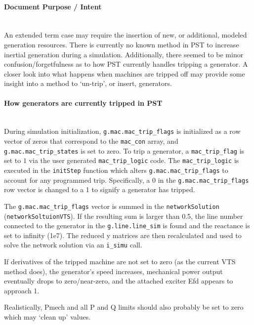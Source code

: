\documentclass[12pt]{article}
\begin{document}
\onehalfspacing
\paragraph{Document Purpose / Intent} \ \\
An extended term case may require the insertion of new, or additional, modeled generation resources.
There is currently no known method in PST to increase inertial generation during a simulation.
Additionally, there seemed to be minor confusion/forgetfulness as to how PST currently handles tripping a generator.
A closer look into what happens when machines are tripped off may provide some insight into a method to `un-trip', or insert, generators.


\paragraph{How generators are currently tripped in PST} \ \\
During simulation initialization, \verb|g.mac.mac_trip_flags| is initialized as a row vector of zeros that correspond to the \verb|mac_con| array, and 
\verb|g.mac.mac_trip_states| is set to zero. %
To trip a generator, a \verb|mac_trip_flag| is set to $1$ via the user generated \verb|mac_trip_logic| code.
The \verb|mac_trip_logic| is executed in the \verb|initStep| function which alters \verb|g.mac.mac_trip_flags| to account for any programmed trip.
Specifically, a $0$ in the \verb|g.mac.mac_trip_flags| row vector is changed to a 1 to signify a generator has tripped.

The \verb|g.mac.mac_trip_flags| vector is summed in the \verb|networkSolution| (\verb|networkSoltuionVTS|).
If the resulting sum is larger than 0.5, the line number connected to the generator in the \verb|g.line.line_sim| is found and the reactance is set to infinity (1e7).
The reduced y matrices are then recalculated and used to solve the network solution via an \verb|i_simu| call.

If derivatives of the tripped machine are not set to zero (as the current VTS method does), the generator's speed increases, mechanical power output eventually drops to zero/near-zero, and the attached exciter Efd appears to approach 1.

Realistically, Pmech and all P and Q limits should also probably be set to zero which may `clean up' values.
\end{document}
